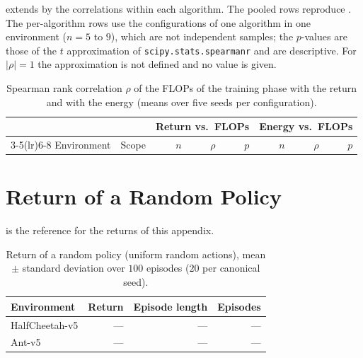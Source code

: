 
 extends  by the correlations within each algorithm.
The pooled rows reproduce .
The per-algorithm rows use the configurations of one algorithm in one environment ($n=5$ to $9$), which are not independent samples; the $p$-values are those of the $t$ approximation of \texttt{scipy.stats.spearmanr} and are descriptive.
For $|\rho|=1$ the approximation is not defined and no value is given.

\begin{table}[tbp]
  \centering
  \footnotesize
  \caption{Spearman rank correlation $\rho$ of the FLOPs of the training phase with the return and with the energy (means over five seeds per configuration).}
  \label{tab:app-spearman}
  \begin{tabular}{@{}llrrrrrr@{}}
    \toprule
                   &           & \multicolumn{3}{c}{Return vs.\ FLOPs} & \multicolumn{3}{c}{Energy vs.\ FLOPs}                                        \\
    \cmidrule(lr){3-5}\cmidrule(lr){6-8}
    Environment    & Scope     & $n$                                   & $\rho$                                & $p$       & $n$ & $\rho$   & $p$       \\
    \midrule
    \bottomrule
  \end{tabular}
\end{table}

\section{Return of a Random Policy}\label{sec:app-learn-random}

 is the reference for the returns of this appendix.

\begin{table}[tbp]
  \centering
  \caption{Return of a random policy (uniform random actions), mean $\pm$ standard deviation over $100$ episodes ($20$ per canonical seed).}
  \label{tab:app-random}
  \begin{tabular}{lrrr}
    \toprule
    Environment    & Return & Episode length & Episodes \\
    \midrule
    HalfCheetah-v5 & ---    & ---            & ---      \\
    Ant-v5         & ---    & ---            & ---      \\
    \bottomrule
  \end{tabular}
\end{table}
